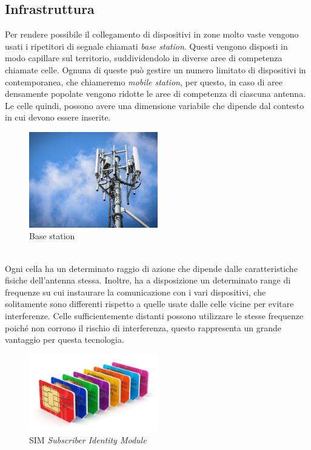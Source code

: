 \clearpage

\subsection{Infrastruttura}
Per rendere possibile il collegamento di dispositivi in zone molto vaste vengono usati i ripetitori di segnale chiamati \textit{base station}. 
Questi vengono disposti in modo capillare sul territorio, suddividendolo in diverse aree di competenza chiamate celle. Ognuna di queste può gestire
un numero limitato di dispositivi in contemporanea, che chiameremo \textit{mobile station}, per questo, in caso di aree densamente popolate vengono 
ridotte le aree di competenza di ciascuna antenna. Le celle quindi, possono avere una dimensione variabile che dipende dal contesto in cui devono essere inserite.
\begin{figure}[h]
    \centering
    \includegraphics[width=0.5\textwidth]{images/base-station.jpg}
    \caption{Base station}
\end{figure}\\
Ogni cella ha un determinato raggio di azione che dipende dalle caratteristiche fisiche dell'antenna stessa. Inoltre, 
ha a disposizione un determinato range di frequenze su cui instaurare la comunicazione con i vari dispositivi, che solitamente
sono differenti rispetto a quelle usate dalle celle vicine per evitare interferenze.
Celle sufficientemente distanti possono utilizzare le stesse frequenze poiché non corrono il rischio di interferenza, questo rappresenta
un grande vantaggio per questa tecnologia.
\begin{figure}[h]
    \centering
    \includegraphics[width=0.5\textwidth]{images/simcard.jpg}
    \caption{SIM \textit{Subscriber Identity Module}}
\end{figure}

